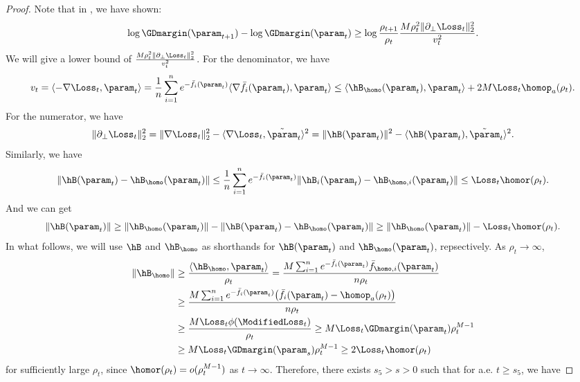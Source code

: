 \begin{proof}

Note that in , we have shown: 
\[
    \log \GDmargin(\param_{t+1}) - \log \GDmargin(\param_t) \ge  \log \frac{\rho_{t+1}}{\rho_t} \frac{M\rho_t^2\|\partial_\perp  \Loss_t\|_2^2}{v_t^2 } . 
\] 
We will give a lower bound of $\frac{M\rho_t^2\|\partial_\perp  \Loss_t\|_2^2}{v_t^2 }$. For the denominator, we have 
\begin{equation}
\label{eq:bound-denom-kkt}
    v_t  = \langle -\nabla \Loss_t, \param_t \rangle = \frac{1}{n}\sum_{i=1}^n e^{-\bar f_i(\param_t)} \langle  \nabla \bar f_i(\param_t), \param_t \rangle \le  \langle \hB_{\homo}(\param_t), \param_t \rangle  + 2M \Loss_t \homop_a(\rho_t). 
\end{equation}
For the numerator, we have 
\begin{equation}
\label{eq:nabla-Lt-square}
        \|\partial_\perp \Loss_t\|_2^2 = \|\nabla \Loss_t\|_2^2 - \langle \nabla \Loss_t, \tilde{\param}_t \rangle ^2 = \| \hB (\param_t) \|^2 - \langle \hB (\param_t), \tilde{\param}_t \rangle ^2. 
\end{equation}
Similarly, we have 
\[
    \|\hB (\param_t) - \hB_{\homo} (\param_t) \| \le \frac{1}{n} \sum_{i=1}^n e^{-\bar f_i(\param_t )} \| \hB_i (\param_t) - \hB_{\homo,i} (\param_t) \| \le \Loss_t\homor (\rho_t).
\]
And we can get 
\[
    \| \hB (\param_t) \| \ge \| \hB_{\homo} (\param_t) \| - \| \hB (\param_t) - \hB_{\homo} (\param_t) \|  \ge \| \hB_{\homo} (\param_t) \| - \Loss_t\homor (\rho_t).
\] 
In what follows, we will use $\hB$ and $\hB_{\homo}$ as shorthands for $\hB (\param_t)$ and $\hB_{\homo} (\param_t)$, repsectively. As $\rho_t \to \infty$, 
\begin{align}
     \| \hB_{\homo}\| &\ge \frac{\langle \hB_{\homo}, \param_t  \rangle }{\rho_t} = \frac{M\sum_{i=1}^{n} e^{-\bar f_i(\param_t )} \bar f_{\homo,i}(\param_t ) }{n \rho_t}  \notag\\ 
     & \ge  \frac{M\sum_{i=1}^{n} e^{-\bar f_i(\param_t )} \big (\bar f_i(\param_t ) - \homop_a(\rho_t) \big) }{n \rho_t} \notag\\ 
     & \ge \frac{M\Loss_t \phi(\ModifiedLoss_t)}{\rho_t} \notag \ge M\Loss_t\GDmargin(\param_t) \rho_t^{M-1} \notag \\
     & \ge M\Loss_t \GDmargin(\param_s) \rho_t^{M-1} \ge 2\Loss_t\homor (\rho_t) \label{eq: h_M lb gd}
\end{align}
for sufficiently large $\rho_t$, since $\homor (\rho_t)= o(\rho_t^{M-1})$ as $t \to \infty$.
Therefore, there exists $s_5 > s>0$ such that for a.e. $t\ge s_5$, we have 

\end{proof}
